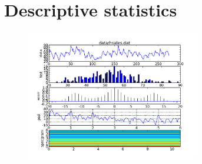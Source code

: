 \section{Descriptive statistics}
\label{sec:stats_descriptives}




\begin{figure}
\begin{centering}\includegraphics[width=3in]{fig/stats_descriptives}\par\end{centering}

\caption{\label{fig:stats_descriptives}}
\end{figure}
